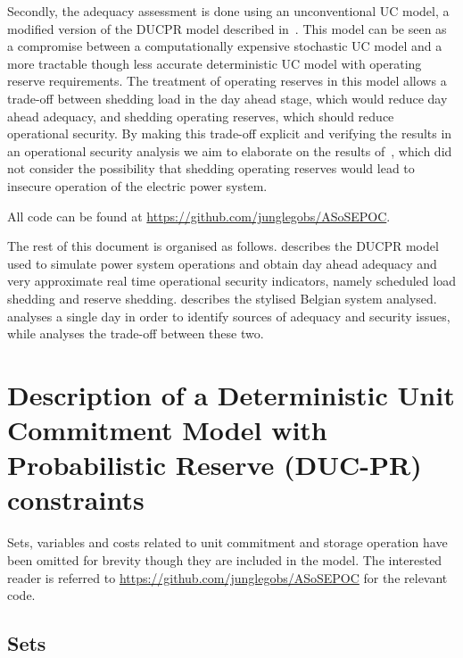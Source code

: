 \documentclass[number,times]{elsarticle}
\begin{document}
Secondly, the adequacy assessment is done using an unconventional \ac{UC} model, a modified version of the \ac{DUCPR} model described in~\cite{Bruninx2017}. This model can be seen as a compromise between a computationally expensive stochastic \ac{UC} model and a more tractable though less accurate deterministic \ac{UC} model with operating reserve requirements. The treatment of operating reserves in this model allows a trade-off between shedding load in the day ahead stage, which would reduce day ahead adequacy, and shedding operating reserves, which should reduce operational security. By making this trade-off explicit and verifying the results in an operational security analysis we aim to elaborate on the results of~\cite{Hermans2018}, which did not consider the possibility that shedding operating reserves would lead to insecure operation of the electric power system.

All code can be found at \href{https://github.com/junglegobs/ASoSEPOC}{https://github.com/junglegobs/ASoSEPOC}.

The rest of this document is organised as follows.  describes the \ac{DUCPR} model used to simulate power system operations and obtain day ahead adequacy and very approximate real time operational security indicators, namely scheduled load shedding and reserve shedding.  describes the stylised Belgian system analysed.  analyses a single day in order to identify sources of adequacy and security issues, while  analyses the trade-off between these two.

\section{Description of a Deterministic Unit Commitment Model with Probabilistic Reserve (DUC-PR) constraints} \label{sec:model}

Sets, variables and costs related to unit commitment and storage operation have been omitted for brevity though they are included in the model. The interested reader is referred to \href{https://github.com/junglegobs/ASoSEPOC}{https://github.com/junglegobs/ASoSEPOC} for the relevant code.

\subsection{Sets}
\end{document}

